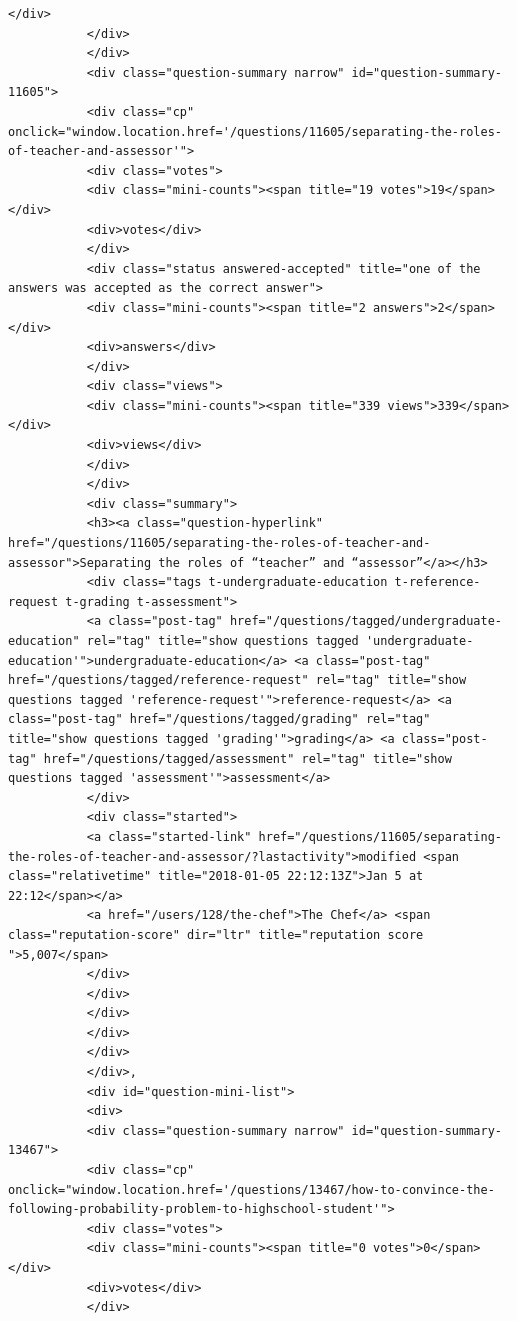 \documentclass[11pt]{article}
\begin{document}
\begin{Verbatim}[commandchars=\\\{\}]
           </div>
           </div>
           </div>
           <div class="question-summary narrow" id="question-summary-11605">
           <div class="cp" onclick="window.location.href='/questions/11605/separating-the-roles-of-teacher-and-assessor'">
           <div class="votes">
           <div class="mini-counts"><span title="19 votes">19</span></div>
           <div>votes</div>
           </div>
           <div class="status answered-accepted" title="one of the answers was accepted as the correct answer">
           <div class="mini-counts"><span title="2 answers">2</span></div>
           <div>answers</div>
           </div>
           <div class="views">
           <div class="mini-counts"><span title="339 views">339</span></div>
           <div>views</div>
           </div>
           </div>
           <div class="summary">
           <h3><a class="question-hyperlink" href="/questions/11605/separating-the-roles-of-teacher-and-assessor">Separating the roles of “teacher” and “assessor”</a></h3>
           <div class="tags t-undergraduate-education t-reference-request t-grading t-assessment">
           <a class="post-tag" href="/questions/tagged/undergraduate-education" rel="tag" title="show questions tagged 'undergraduate-education'">undergraduate-education</a> <a class="post-tag" href="/questions/tagged/reference-request" rel="tag" title="show questions tagged 'reference-request'">reference-request</a> <a class="post-tag" href="/questions/tagged/grading" rel="tag" title="show questions tagged 'grading'">grading</a> <a class="post-tag" href="/questions/tagged/assessment" rel="tag" title="show questions tagged 'assessment'">assessment</a>
           </div>
           <div class="started">
           <a class="started-link" href="/questions/11605/separating-the-roles-of-teacher-and-assessor/?lastactivity">modified <span class="relativetime" title="2018-01-05 22:12:13Z">Jan 5 at 22:12</span></a>
           <a href="/users/128/the-chef">The Chef</a> <span class="reputation-score" dir="ltr" title="reputation score ">5,007</span>
           </div>
           </div>
           </div>
           </div>
           </div>
           </div>,
           <div id="question-mini-list">
           <div>
           <div class="question-summary narrow" id="question-summary-13467">
           <div class="cp" onclick="window.location.href='/questions/13467/how-to-convince-the-following-probability-problem-to-highschool-student'">
           <div class="votes">
           <div class="mini-counts"><span title="0 votes">0</span></div>
           <div>votes</div>
           </div>

\end{Verbatim}
\end{document}
